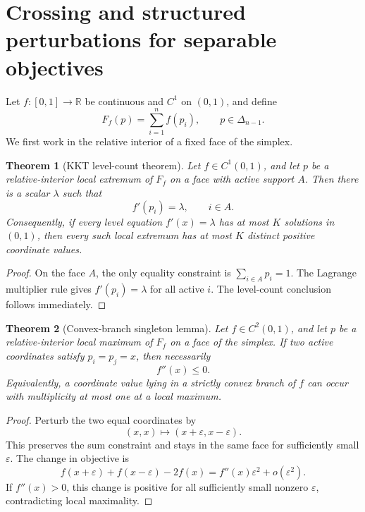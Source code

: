 \documentclass[11pt]{article}
\newtheorem{theorem}{Theorem}[section]
\theoremstyle{definition}
\begin{document}
\section{Crossing and structured perturbations for separable objectives}

Let $f:[0,1]\to\mathbb R$ be continuous and $C^1$ on $(0,1)$, and define
\[
  F_f(p)=\sum_{i=1}^n f(p_i),\qquad p\in\Delta_{n-1}.
\]
We first work in the relative interior of a fixed face of the simplex.

\begin{theorem}[KKT level-count theorem]\label{thm:kkt-level}
Let $f\in C^1(0,1)$, and let $p$ be a relative-interior local extremum of $F_f$ on a face with active support $A$. Then there is a scalar $\lambda$ such that
\[
  f'(p_i)=\lambda,\qquad i\in A.
\]
Consequently, if every level equation $f'(x)=\lambda$ has at most $K$ solutions in $(0,1)$, then every such local extremum has at most $K$ distinct positive coordinate values.
\end{theorem}

\begin{proof}
On the face $A$, the only equality constraint is $\sum_{i\in A}p_i=1$. The Lagrange multiplier rule gives $f'(p_i)=\lambda$ for all active $i$. The level-count conclusion follows immediately.
\end{proof}

\begin{theorem}[Convex-branch singleton lemma]\label{thm:convex-singleton}
Let $f\in C^2(0,1)$, and let $p$ be a relative-interior local maximum of $F_f$ on a face of the simplex. If two active coordinates satisfy $p_i=p_j=x$, then necessarily
\[
  f''(x)\le 0.
\]
Equivalently, a coordinate value lying in a strictly convex branch of $f$ can occur with multiplicity at most one at a local maximum.
\end{theorem}

\begin{proof}
Perturb the two equal coordinates by
\[
  (x,x)\mapsto (x+\varepsilon,x-\varepsilon).
\]
This preserves the sum constraint and stays in the same face for sufficiently small $\varepsilon$. The change in objective is
\[
  f(x+\varepsilon)+f(x-\varepsilon)-2f(x)
    = f''(x)\varepsilon^2+o(\varepsilon^2).
\]
If $f''(x)>0$, this change is positive for all sufficiently small nonzero $\varepsilon$, contradicting local maximality.
\end{proof}
\end{document}
